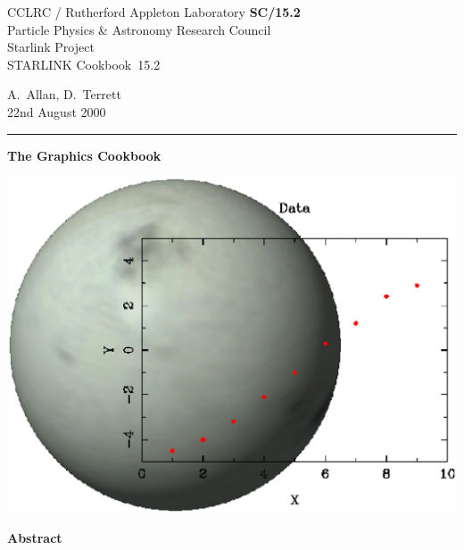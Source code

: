 \documentclass[twoside,11pt]{article}
\newcommand{\stardoccategory}  {STARLINK Cookbook}
\newcommand{\stardocinitials}  {SC}
\newcommand{\stardocnumber}    {15.2}
\newcommand{\stardocauthors}   {A.~Allan, D.~Terrett}
\newcommand{\stardocdate}      {22nd August 2000}
\newcommand{\stardoctitle}     {The Graphics Cookbook}
\newcommand{\stardocname}{\stardocinitials /\stardocnumber}
\newenvironment{latexonly}{}{}
\begin{document}
\thispagestyle{empty}

\begin{latexonly}
   CCLRC / {\sc Rutherford Appleton Laboratory} \hfill {\bf \stardocname}\\
   {\large Particle Physics \& Astronomy Research Council}\\
   {\large Starlink Project\\}
   {\large \stardoccategory\ \stardocnumber}
   \begin{flushright}
   \stardocauthors\\
   \stardocdate
   \end{flushright}
   \vspace{-4mm}
   \rule{\textwidth}{0.5mm}
   \vspace{5mm}
   \begin{center}
   {\Huge\bf  \stardoctitle \\ [2.5ex]}
   \end{center}
   \vspace{5mm}

   \begin{center}
   \includegraphics[scale=0.6]{sc15_cover2.eps}
   \end{center}

   \vspace{5mm}
   \begin{center}
      {\Large\bf Abstract}
   \end{center}
\end{latexonly}
\end{document}
